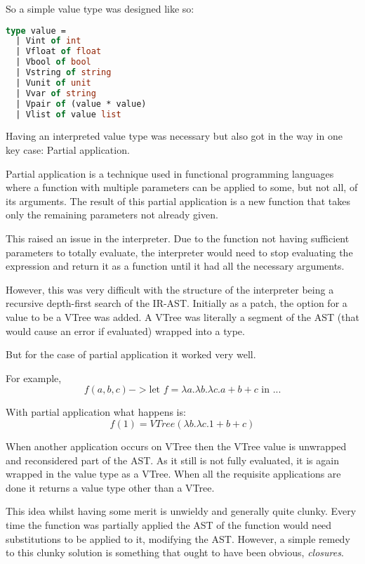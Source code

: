 \documentclass{l4proj}
\begin{document}
So a simple value type was designed like so:

\begin{lstlisting}[language=Caml, caption="PyFunc's Interpreter value type definition.]
type value = 
  | Vint of int 
  | Vfloat of float
  | Vbool of bool 
  | Vstring of string 
  | Vunit of unit 
  | Vvar of string 
  | Vpair of (value * value)
  | Vlist of value list
\end{lstlisting}

Having an interpreted value type was necessary but also got in the way in one key case: Partial application.

Partial application is a technique used in functional programming languages where a function with multiple parameters can be applied to some, but not all, of its arguments.
The result of this partial application is a new function that takes only the remaining parameters not already given.

This raised an issue in the interpreter.
Due to the function not having sufficient parameters to totally evaluate, the interpreter would need to stop evaluating the expression and return it as a function until it had all the necessary arguments.

However, this was very difficult with the structure of the interpreter being a recursive depth-first search of the IR-AST.
Initially as a patch, the option for a value to be a VTree was added.
A VTree was literally a segment of the AST (that would cause an error if evaluated) wrapped into a type.

But for the case of partial application it worked very well.

For example, \[ f(a, b, c) -> \text{let } f = \lambda a. \lambda b. \lambda c. a + b + c \text{ in ...}\]

With partial application what happens is: 
\[f (1) = VTree (\lambda b. \lambda c. 1 + b + c)\]

When another application occurs on VTree then the VTree value is unwrapped and reconsidered part of the AST.
As it still is not fully evaluated, it is again wrapped in the value type as a VTree.
When all the requisite applications are done it returns a value type other than a VTree.

This idea whilst having some merit is unwieldy and generally quite clunky.
Every time the function was partially applied the AST of the function would need substitutions to be applied to it, modifying the AST.
However, a simple remedy to this clunky solution is something that ought to have been obvious, \emph{closures}.
\end{document}
